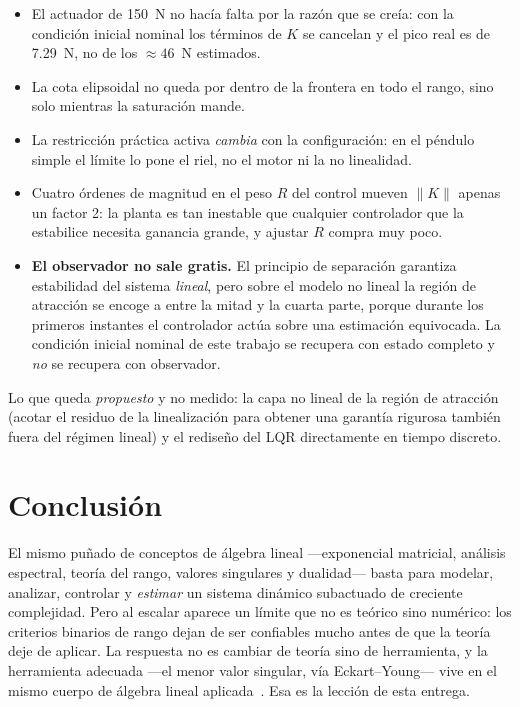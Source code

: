 \documentclass[11pt,letterpaper]{article}
\begin{document}
\begin{itemize}
  \item El actuador de 150~N no hacía falta por la razón que se creía: con la
  condición inicial nominal los términos de $K$ se cancelan y el pico real es de
  7.29~N, no de los $\approx46$~N estimados.
  \item La cota elipsoidal no queda por dentro de la frontera en todo el rango,
  sino solo mientras la saturación mande.
  \item La restricción práctica activa \emph{cambia} con la configuración: en el
  péndulo simple el límite lo pone el riel, no el motor ni la no linealidad.
  \item Cuatro órdenes de magnitud en el peso $R$ del control mueven $\|K\|$
  apenas un factor 2: la planta es tan inestable que cualquier controlador que
  la estabilice necesita ganancia grande, y ajustar $R$ compra muy poco.
  \item \textbf{El observador no sale gratis.} El principio de separación
  garantiza estabilidad del sistema \emph{lineal}, pero sobre el modelo no
  lineal la región de atracción se encoge a entre la mitad y la cuarta parte,
  porque durante los primeros instantes el controlador actúa sobre una
  estimación equivocada. La condición inicial nominal de este trabajo se
  recupera con estado completo y \emph{no} se recupera con observador.
\end{itemize}

Lo que queda \emph{propuesto} y no medido: la capa no lineal de la región de
atracción (acotar el residuo de la linealización para obtener una garantía
rigurosa también fuera del régimen lineal) y el rediseño del LQR directamente en
tiempo discreto.

\section{Conclusión}

El mismo puñado de conceptos de álgebra lineal ---exponencial matricial,
análisis espectral, teoría del rango, valores singulares y dualidad--- basta
para modelar, analizar, controlar y \emph{estimar} un sistema dinámico
subactuado de creciente complejidad. Pero al escalar aparece un límite que no es
teórico sino numérico: los criterios binarios de rango dejan de ser confiables
mucho antes de que la teoría deje de aplicar. La respuesta no es cambiar de
teoría sino de herramienta, y la herramienta adecuada ---el menor valor singular,
vía Eckart--Young--- vive en el mismo cuerpo de álgebra lineal
aplicada~\cite{olver2018,boyd2018}. Esa es la lección de esta entrega.
\end{document}
